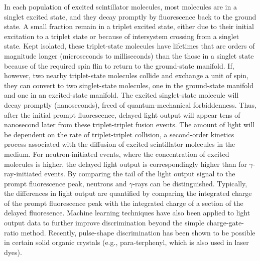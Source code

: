 In each population of excited scintillator molecules, most molecules are in a
singlet excited state, and they decay promptly by fluorescence back to the
ground state. A small fraction remain in a triplet excited state,
either due to their initial excitation to a
triplet state or because of intersystem crossing from a singlet state. Kept isolated, these
triplet-state molecules have lifetimes that are orders of magnitude longer
(microseconds to milliseconds) than the those in a singlet state because of the required spin
flin to return to the ground-state manifold. If, however, two nearby triplet-state
molecules collide and exchange a unit of spin, they can convert to two singlet-state
molecules, one in the ground-state manifold and one in an excited-state manifold. The excited
singlet-state molecule will decay promptly (nanoseconds), freed of quantum-mechanical forbiddenness.
Thus, after the initial prompt fluorescence, delayed light output will appear tens of nanosecond
later from these triplet-triplet fusion events. The amount of light will be
dependent on the rate of triplet-triplet collision, a second-order kinetics
process associated with the diffusion of excited scintillator molecules in the
medium. For neutron-initiated events, where the concentration of excited molecules is
higher, the delayed light output is correspondingly higher than for $\gamma$-ray-initiated
events. By comparing the tail of the light output signal to the prompt
fluorescence peak, neutrons and $\gamma$-rays can be distinguished. Typically, the differences in
light output are quantified by comparing the integrated charge of the prompt fluorescence peak
with the integrated charge of a section of the delayed fluoresence. Machine learning 
techniques have also been applied to light output data to further improve discrimination 
\cite{Doucet2018} beyond the simple charge-gate-ratio method. Recently, pulse-shape
discrimination has been shown to be possible in certain solid organic crystals (e.g.,
para-terphenyl, which is also used in laser dyes).

